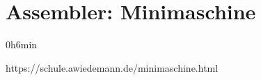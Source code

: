 \documentclass{lehramt-informatik-haupt}
\begin{document}

\chapter{Assembler: Minimaschine}

0h6min

https://schule.awiedemann.de/minimaschine.html

\literatur
\end{document}
